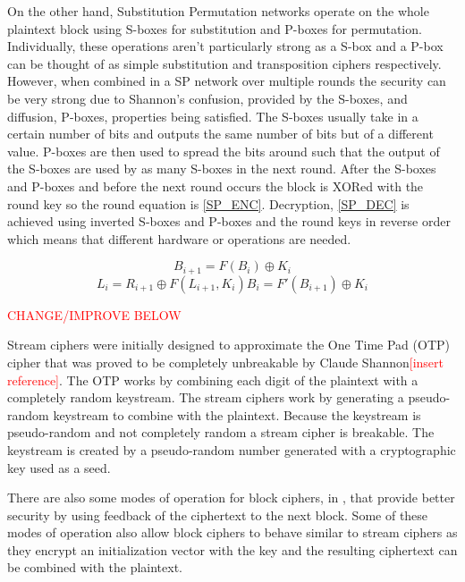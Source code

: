 \documentclass[12pt,twoside,a4paper]{report}
\begin{document}
    On the other hand, Substitution Permutation networks operate on the whole plaintext block using S-boxes for substitution and P-boxes for permutation. Individually, these operations aren't particularly strong as a S-box and a P-box can be thought of as simple substitution and transposition ciphers respectively. However, when combined in a SP network over multiple rounds the security can be very strong due to Shannon's confusion, provided by the S-boxes, and diffusion, P-boxes, properties being satisfied\cite{Shannon1949}. The S-boxes usually take in a certain number of bits and outputs the same number of bits but of a different value. P-boxes are then used to spread the bits around such that the output of the S-boxes are used by as many S-boxes in the next round. After the S-boxes and P-boxes and before the next round occurs the block is XORed with the round key so the round equation is \autoref{SP_ENC}. Decryption, \autoref{SP_DEC} is achieved using inverted S-boxes and P-boxes and the round keys in reverse order which means that different hardware or operations are needed.
    
    \begin{equation}
    \label{SP_ENC}
    B_{i+1} = F(B_i) \oplus K_i
    \end{equation}
    \begin{equation}
    \label{SP_DEC}
    L_i = R_{i+1} \oplus F(L_{i+1}, K_i)B_i = F'(B_{i+1}) \oplus K_i
    \end{equation}
    
    \textcolor{red}{CHANGE/IMPROVE BELOW} 
    
    Stream ciphers were initially designed to approximate the One Time Pad (OTP) cipher that was proved to be completely unbreakable by Claude Shannon\textcolor{red}{[insert reference]}. The OTP works by combining each digit of the plaintext with a completely random keystream. The stream ciphers work by generating a pseudo-random keystream to combine with the plaintext\cite{Robshaw1995}. Because the keystream is pseudo-random and not completely random a stream cipher is breakable. The keystream is created by a pseudo-random number generated with a cryptographic key used as a seed.   
    
    There are also some modes of operation for block ciphers, in \cite{Dworkin2001}, that provide better security by using feedback of the ciphertext to the next block. Some of these modes of operation also allow block ciphers to behave similar to stream ciphers as they encrypt an initialization vector with the key and the resulting ciphertext can be combined with the plaintext.
    
\end{document}
